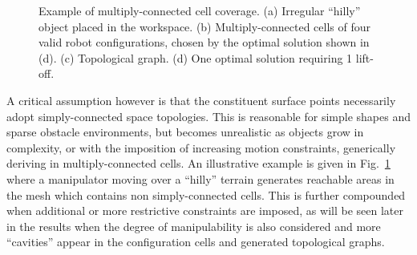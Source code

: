 \documentclass[conference]{IEEEtran}
\begin{document}
\begin{figure}[t]
\centering
{}
\caption{Example of multiply-connected cell coverage. (a) Irregular ``hilly'' object placed in the workspace. 
(b) Multiply-connected cells of four valid robot configurations, chosen by the optimal solution shown in (d). 
(c) Topological graph. (d) One optimal solution requiring 1 lift-off.}
\label{fig:hill_multiply_conn}
\end{figure}

A critical assumption however is that the constituent surface points necessarily adopt simply-connected space topologies. 
This is reasonable for simple shapes and sparse obstacle environments, but becomes unrealistic as objects grow in complexity, 
or with the imposition of increasing motion constraints, generically deriving in multiply-connected cells. An illustrative example is 
given in Fig.~\ref{fig:hill_multiply_conn} where a manipulator moving over a ``hilly'' terrain generates reachable areas in the
 mesh which contains non simply-connected cells. This is further compounded when additional or more restrictive constraints are imposed, 
 as will be seen later in the results when the degree of manipulability is also considered and more ``cavities'' appear in the configuration 
 cells and generated topological graphs.
\end{document}
